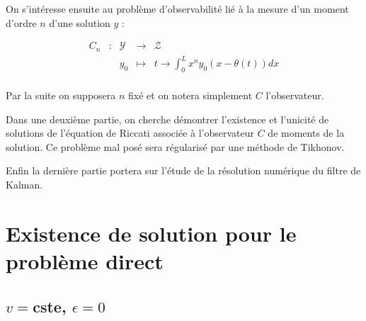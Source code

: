 \documentclass[a4paper]{article}
\begin{document}
\vspace{0.3cm}

On s'intéresse ensuite au problème d'observabilité lié à la mesure d'un moment d'ordre $n$ d'une solution $y$ :

 \begin{equation}
	\begin{array}{cc|ccc}
	C_n & : & \mathscr{Y} & \to & \mathscr{Z} \\
	 & & y_0 & \mapsto & t \to \int_0^L x^n y_0(x-\theta(t)) dx\\
	\end{array}
\end{equation}

Par la suite on supposera $n$ fixé et on notera simplement $C$ l'observateur.

Dans une deuxième partie, on cherche démontrer l'existence et l'unicité de solutions
de l'équation de Riccati associée à l'observateur $C$ de moments de la solution.
Ce problème mal posé sera régularisé par une méthode de Tikhonov.

Enfin la dernière partie portera sur l'étude de la résolution numérique 
du filtre de Kalman.

\newpage
\section{Existence de solution pour le problème direct}




\subsection{$v=$cste, $\epsilon = 0$}
\end{document}
